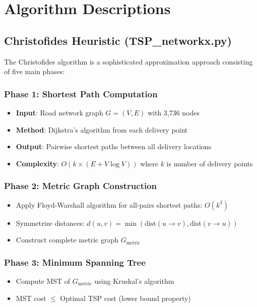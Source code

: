 \documentclass[9pt,a4paper,twoside]{tau}
\begin{document}

\section{Algorithm Descriptions}

\subsection{Christofides Heuristic (TSP\_networkx.py)}

The Christofides algorithm is a sophisticated approximation approach consisting of five main phases:

\subsubsection{Phase 1: Shortest Path Computation}
\begin{itemize}
    \item \textbf{Input}: Road network graph $G = (V, E)$ with 3,736 nodes
    \item \textbf{Method}: Dijkstra's algorithm from each delivery point
    \item \textbf{Output}: Pairwise shortest paths between all delivery locations
    \item \textbf{Complexity}: $O(k \times (E + V \log V))$ where $k$ is number of delivery points
\end{itemize}

\subsubsection{Phase 2: Metric Graph Construction}
\begin{itemize}
    \item Apply Floyd-Warshall algorithm for all-pairs shortest paths: $O(k^3)$
    \item Symmetrize distances: $d(u,v) = \min(\text{dist}(u \to v), \text{dist}(v \to u))$
    \item Construct complete metric graph $G_{\text{metric}}$
\end{itemize}

\subsubsection{Phase 3: Minimum Spanning Tree}
\begin{itemize}
    \item Compute MST of $G_{\text{metric}}$ using Kruskal's algorithm
    \item MST cost $\leq$ Optimal TSP cost (lower bound property)
\end{itemize}
\end{document}
